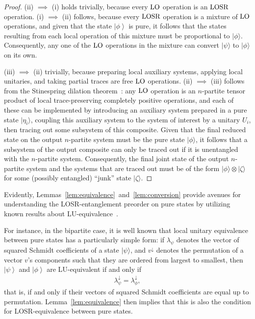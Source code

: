 \documentclass[12pt]{article}
\newcommand{\ket}[1]{\left| #1 \right>}
\newcommand{\LOSR}[0]{\ifmmode\textup{\upshape LOSR}\else{\textup{\upshape LOSR}}\fi}
\newcommand{\LO}[0]{\ifmmode\textup{\upshape LO}\else{\textup{\upshape LO}}\fi}
\theoremstyle{plain}
\theoremstyle{definition}
\begin{document}
\begin{proof}
    (ii) $\implies$ (i) holds trivially, because every $\LO$ operation is an $\LOSR$ operation. (i) $\implies$ (ii) follows, because every $\LOSR$ operation is a mixture of $\LO$ operations, and given that the state $\ket{\phi}$ is pure, it follows that
     the states resulting from each local operation of this mixture must be proportional to $|\phi\rangle$. Consequently, any one of the $\LO$ operations in the mixture can convert $|\psi\rangle$ to $|\phi\rangle$ on its own.

    (iii) $\implies$ (ii) trivially, because preparing local auxiliary systems, applying local unitaries, and taking partial traces are free $\LO$ operations. (ii) $\implies$ (iii) follows from the Stinespring dilation theorem~\cite{Stinespring1955,Paulsen2003Apr}: any $\LO$ operation is an $n$-partite tensor product of local trace-preserving completely positive operations, and each of these 
    can be implemented by introducing an auxiliary system prepared in a pure state $|\eta_i\rangle $, coupling this auxiliary system to the system of interest by a unitary $U_i$, then tracing out some subsystem of this composite.
  Given that the final reduced state on the output $n$-partite system must be the pure state $|\phi\rangle$, it follows that a subsystem of the output composite can only be traced out if it is unentangled with the $n$-partite system.  Consequently, the final joint state of the output $n$-partite system and the systems that are traced out
  must be of the form $|\phi\rangle \otimes |\zeta\rangle$ for some (possibly entangled) ``junk'' state $|\zeta\rangle$.
\end{proof}

Evidently, Lemmas~\ref{lem:equivalence}~and~\ref{lem:conversion} provide avenues for understanding the LOSR-entanglement preorder on pure states by utilizing known results about LU-equivalence~\cite{Kraus2010Local,liu2012local,Acin2001puretriclassify,Barnum2001,biamonte2013tensor}. 

For instance, in the bipartite case, it is well known that local unitary equivalence between pure  states has a particularly simple form: if $\lambda_{\psi}$ denotes the vector of squared Schmidt coefficients of a state $|\psi\rangle$, and $v^{\downarrow}$ denotes the permutation of a vector $v$'s components such that they are ordered from largest to smallest, then $\ket \psi$ and $\ket \phi$ are LU-equivalent if and only if 
\begin{align}
    \label{eq:bipartite_LUequivalence}
     \lambda_{\psi}^{\downarrow} = \lambda_{\phi}^{\downarrow},
\end{align}
that is, if and only if their vectors of squared Schmidt coefficients are equal up to permutation.
Lemma~\ref{lem:equivalence} then implies that this is also the condition for LOSR-equivalence between pure states.  
\end{document}
